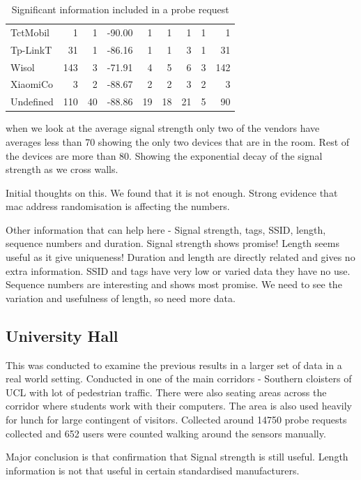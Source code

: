 \begin{table}
\begin{center}
\begin{tabular}{lrrrrrrrr}
  TctMobil &   1 &   1 & -90.00 &   1 &   1 &   1 &   1 &   1 \\ 
  Tp-LinkT &  31 &   1 & -86.16 &   1 &   1 &   3 &   1 &  31 \\ 
  Wisol & 143 &   3 & -71.91 &   4 &   5 &   6 &   3 & 142 \\ 
  XiaomiCo &   3 &   2 & -88.67 &   2 &   2 &   3 &   2 &   3 \\ 
  Undefined & 110 &  40 & -88.86 &  19 &  18 &  21 &   5 &  90 \\ 
  \bottomrule
  \end{tabular}
\end{center}
\caption{Significant information included in a probe request}
\label{table:collection:proberequest}
\end{table}

when we look at the average signal strength only two of the vendors have averages less than 70 showing the only two devices that are in the room. Rest of the devices are more than 80. Showing the exponential decay of the signal strength as we cross walls.



Initial thoughts on this.
We found that it is not enough.
Strong evidence that mac address randomisation is affecting the numbers.

Other information that can help here - Signal strength, tags, SSID, length, sequence numbers and duration.
Signal strength shows promise!
Length seems useful as it give uniqueness!
Duration and length are directly related and gives no extra information.
SSID and tags have very low or varied data they have no use.
Sequence numbers are interesting and shows most promise.
We need to see the variation and usefulness of length, so need more data.

\subsection{University Hall}
This was conducted to examine the previous results in a larger set of data in a real world setting.
Conducted in one of the main corridors - Southern cloisters of UCL with lot of pedestrian traffic.
There were also seating areas across the corridor where students work with their computers.
The area is also used heavily for lunch for large contingent of visitors.
Collected around 14750 probe requests collected and 652 users were counted walking around the sensors manually.

Major conclusion is that confirmation that Signal strength is still useful.
Length information is not that useful in certain standardised manufacturers.

